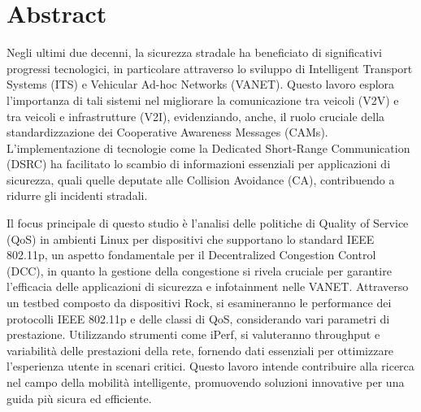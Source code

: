 \thispagestyle{plain}
\section*{Abstract}
Negli ultimi due decenni, la sicurezza stradale ha beneficiato di significativi progressi tecnologici, in particolare attraverso lo sviluppo di Intelligent Transport Systems (ITS) e Vehicular Ad-hoc Networks (VANET). Questo lavoro esplora l'importanza di tali sistemi nel migliorare la comunicazione tra veicoli (V2V) e tra veicoli e infrastrutture (V2I), evidenziando, anche, il ruolo cruciale della standardizzazione dei Cooperative Awareness Messages (CAMs). L'implementazione di tecnologie come la Dedicated Short-Range Communication (DSRC) ha facilitato lo scambio di informazioni essenziali per applicazioni di sicurezza, quali quelle deputate alle Collision Avoidance (CA), contribuendo a ridurre gli incidenti stradali.

Il focus principale di questo studio è l'analisi delle politiche di Quality of Service (QoS) in ambienti Linux per dispositivi che supportano lo standard IEEE 802.11p, un aspetto fondamentale per il Decentralized Congestion Control (DCC), in quanto la gestione della congestione si rivela cruciale per garantire l'efficacia delle applicazioni di sicurezza e infotainment nelle VANET. Attraverso un testbed composto da dispositivi Rock, si esamineranno le performance dei protocolli IEEE 802.11p e delle classi di QoS, considerando vari parametri di prestazione. Utilizzando strumenti come iPerf, si valuteranno throughput e variabilità delle prestazioni della rete, fornendo dati essenziali per ottimizzare l'esperienza utente in scenari critici. Questo lavoro intende contribuire alla ricerca nel campo della mobilità intelligente, promuovendo soluzioni innovative per una guida più sicura ed efficiente.
